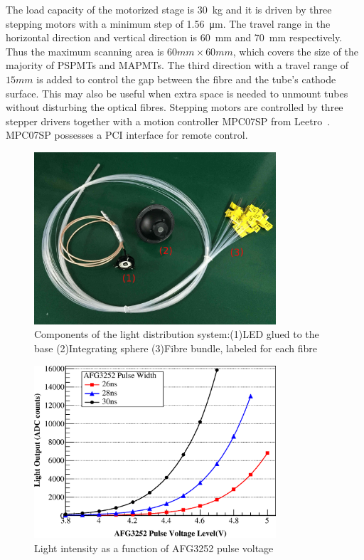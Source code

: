 \documentclass[5p, times]{elsarticle}
\begin{document}
The load capacity of the motorized stage is \SI{30}{\kilo\gram} and it is driven by three stepping motors with a minimum step of \SI{1.56}{\micro\meter}.%
The travel range in the horizontal direction and vertical direction is \SI{60}{\milli\meter} and \SI{70}{\milli\meter} respectively.%
Thus the maximum scanning area is $60mm\times60mm$, which covers the size of the majority of PSPMTs and MAPMTs.
The third direction with a travel range of $15mm$ is added to control the gap between the fibre and the tube's cathode surface.
This may also be useful when extra space is needed to unmount tubes without disturbing the optical fibres. 
Stepping motors are controlled by three stepper drivers together with a motion controller MPC07SP from Leetro~\cite{leetro}.
MPC07SP possesses a PCI interface for remote control.

\begin{figure}
 \centering
 \includegraphics[width=90mm]{fibre_led_insphere_crop}
\caption{Components of the light distribution system:(1)LED glued to the base (2)Integrating sphere (3)Fibre bundle, labeled for each fibre}
\label{fig:fibre_led_sphere}
\end{figure} 

\begin{figure}
 \centering
 \includegraphics[width=90mm]{intesityVSvoltage}
\caption{Light intensity as a function of AFG3252 pulse voltage}
\label{fig:afg3252_intensityVSvoltage}
\end{figure} 
\end{document}
